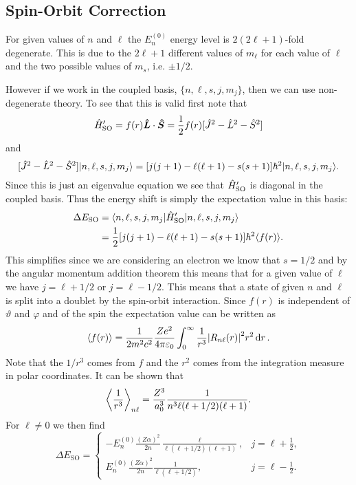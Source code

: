     \subsection{Spin-Orbit Correction}
    For given values of \(n\) and \(\ell\) the \(E_n^{(0)}\) energy level is \(2(2\ell + 1)\)-fold degenerate.
    This is due to the \(2\ell + 1\) different values of \(m_\ell\) for each value of \(\ell\) and the two possible values of \(m_s\), i.e. \(\pm 1/2\).
    
    However if we work in the coupled basis, \(\{n,\ell, s, j, m_j\}\), then we can use non-degenerate theory.
    To see that this is valid first note that
    \[\hat{H}'_{\mathrm{SO}} = f(r)\bm{\hat{L}}\cdot\bm{\hat{S}} = \frac{1}{2}f(r)[\hat{J}^2 - \hat{L}^2 - \hat{S}^2]\]
    and
    \[[\hat{J}^2 - \hat{L}^2 - \hat{S}^2]\vert {n, \ell, s, j, m_j} \rangle = [j(j + 1) - \ell(\ell + 1) - s(s + 1)]\hbar^2\vert {n, \ell, s, j, m_j} \rangle.\]
    Since this is just an eigenvalue equation we see that \(\hat{H}'_{\mathrm{SO}}\) is diagonal in the coupled basis.
    Thus the energy shift is simply the expectation value in this basis:
    \begin{align*}
        \Delta E_{\mathrm{SO}} &= \langle {n, \ell, s, j, m_j} \vert \hat{H}'_{\mathrm{SO}}\vert {n, \ell, s, j, m_j} \rangle\\
        &= \frac{1}{2}[j(j + 1) - \ell(\ell + 1) - s(s + 1)]\hbar^2\langle{f(r)}\rangle.
    \end{align*}
    This simplifies since we are considering an electron we know that \(s = 1/2\) and by the angular momentum addition theorem this means that for a given value of \(\ell\)  we have \(j = \ell + 1/2\) or \(j = \ell - 1/2\).
    This means that a state of given \(n\) and \(\ell\) is split into a doublet by the spin-orbit interaction.
    Since \(f(r)\) is independent of \(\vartheta\) and \(\varphi\) and of the spin the expectation value can be written as
    \[\langle{f(r)}\rangle = \frac{1}{2m^2c^2}\frac{Ze^2}{4\pi\varepsilon_0}\int_0^{\infty} \frac{1}{r^3}\abs{R_{n\ell}(r)}^2r^2\dd{r}.\]
    Note that the \(1/r^3\) comes from \(f\) and the \(r^2\) comes from the integration measure in polar coordinates.
    It can be shown that
    \[\left\langle {\frac{1}{r^3}} \right\rangle_{n\ell} = \frac{Z^3}{a_0^3}\frac{1}{n^3\ell(\ell + 1/2)(\ell + 1)}.\]
    For \(\ell \ne 0\) we then find
    \[\Delta E_{\mathrm{SO}} =
        \begin{cases}
            -E_n^{(0)}\frac{(Z\alpha)^2}{2n}\frac{\ell}{\ell(\ell + 1/2)(\ell + 1)}, & j = \ell + \frac{1}{2},\\
            E_n^{(0)}\frac{(Z\alpha)^2}{2n}\frac{1}{\ell(\ell + 1/2)}, & j = \ell - \frac{1}{2}.
        \end{cases}
    \]
    
